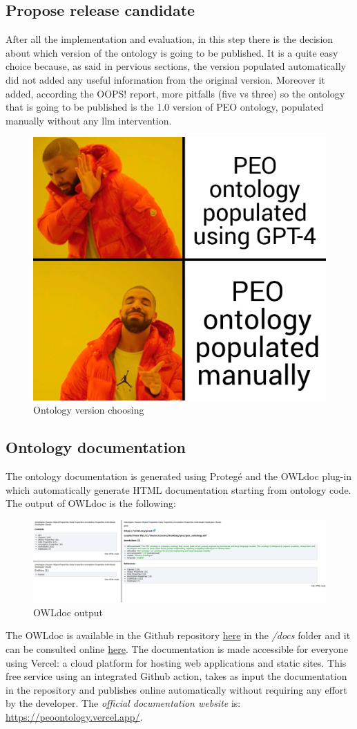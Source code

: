 \subsection{Propose release candidate}
After all the implementation and evaluation, in this step there is the decision about which version of the ontology is going to be published. It is a quite easy choice because, as said in pervious sections, the version populated automatically did not added any useful information from the original version. Moreover it added, according the OOPS! report, more pitfalls (five vs three) so the ontology that is going to be published is the 1.0 version of PEO ontology, populated manually without any llm intervention.
\begin{figure}[H]
    \centering
    \includegraphics[width=0.36\linewidth]{Figures/fig_64.jpg}
    \caption{Ontology version choosing}
    \label{fig:enter-label}
\end{figure}

\subsection{Ontology documentation}
The ontology documentation is generated using Protegé and the OWLdoc plug-in which automatically generate HTML documentation starting from ontology code. The output of OWLdoc is the following:
\begin{figure}[H]
    \centering
    \includegraphics[width=0.9\linewidth]{Figures/fig_63.png}
    \caption{OWLdoc output}
    \label{fig:enter-label}
\end{figure}
The OWLdoc is available in the Github repository \href{https://github.com/simonegramegna/peo/tree/main/docs}{here} in the \textit{/docs} folder and it can be consulted online \href{https://peoontology.vercel.app/}{here}. The documentation is made accessible for everyone using Vercel: a cloud platform for hosting web applications and static sites. This free service using an integrated Github action, takes as input the documentation in the repository and publishes online automatically without requiring any effort by the developer. The \textit{official documentation website} is:
\href{https://peoontology.vercel.app/}{https://peoontology.vercel.app/}.

